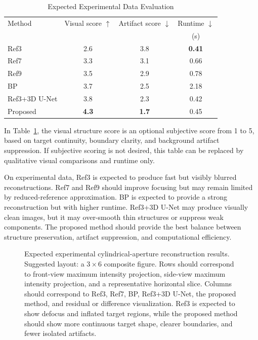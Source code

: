 \documentclass[journal]{IEEEtran}
\begin{document}
\begin{table}[t]
\caption{Expected Experimental Data Evaluation}
\label{tab:experimental_results}
\centering
\begin{tabular}{lccc}
\hline
Method & Visual score $\uparrow$ & Artifact score $\downarrow$ & Runtime $\downarrow$ \\
 &  &  & (s) \\
\hline
Ref3 & 2.6 & 3.8 & \textbf{0.41} \\
Ref7 & 3.3 & 3.1 & 0.66 \\
Ref9 & 3.5 & 2.9 & 0.78 \\
BP & 3.7 & 2.5 & 2.18 \\
Ref3+3D U-Net & 3.8 & 2.3 & 0.42 \\
Proposed & \textbf{4.3} & \textbf{1.7} & 0.45 \\
\hline
\end{tabular}
\end{table}

In Table~\ref{tab:experimental_results}, the visual structure score is an optional subjective score from 1 to 5, based on target continuity, boundary clarity, and background artifact suppression. If subjective scoring is not desired, this table can be replaced by qualitative visual comparisons and runtime only.

On experimental data, Ref3 is expected to produce fast but visibly blurred reconstructions. Ref7 and Ref9 should improve focusing but may remain limited by reduced-reference approximation. BP is expected to provide a strong reconstruction but with higher runtime. Ref3+3D U-Net may produce visually clean images, but it may over-smooth thin structures or suppress weak components. The proposed method should provide the best balance between structure preservation, artifact suppression, and computational efficiency.

\begin{figure}[t]
\centering
{}
\caption{Expected experimental cylindrical-aperture reconstruction results. Suggested layout: a $3\times6$ composite figure. Rows should correspond to front-view maximum intensity projection, side-view maximum intensity projection, and a representative horizontal slice. Columns should correspond to Ref3, Ref7, BP, Ref3+3D U-Net, the proposed method, and residual or difference visualization. Ref3 is expected to show defocus and inflated target regions, while the proposed method should show more continuous target shape, clearer boundaries, and fewer isolated artifacts.}
\label{fig:experimental_visual}
\end{figure}
\end{document}
